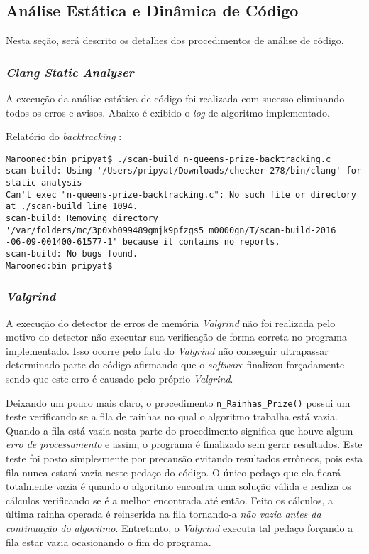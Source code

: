 \documentclass[12pt]{article}
\begin{document}
	\subsection{Análise Estática e Dinâmica de Código}
		Nesta seção, será descrito os detalhes dos procedimentos de análise de código.

	\subsubsection{\textit{Clang Static Analyser}}

		A execução da análise estática de código foi realizada com sucesso eliminando todos os erros e avisos. Abaixo é exibido o \textit{log} de algoritmo implementado.

		Relatório do \textit{backtracking} :
{\scriptsize
\begin{verbatim}
Marooned:bin pripyat$ ./scan-build n-queens-prize-backtracking.c
scan-build: Using '/Users/pripyat/Downloads/checker-278/bin/clang' for static analysis
Can't exec "n-queens-prize-backtracking.c": No such file or directory at ./scan-build line 1094.
scan-build: Removing directory '/var/folders/mc/3p0xb099489gmjk9pfzgs5_m0000gn/T/scan-build-2016
-06-09-001400-61577-1' because it contains no reports.
scan-build: No bugs found.
Marooned:bin pripyat$
\end{verbatim}
}

	\subsubsection{\textit{Valgrind}}
		A execução do detector de erros de memória \textit{Valgrind} não foi realizada pelo motivo do detector não executar sua verificação de forma correta no programa implementado. Isso ocorre pelo fato do \textit{Valgrind} não conseguir ultrapassar determinado parte do código afirmando que o \textit{software} finalizou forçadamente sendo que este erro é causado pelo próprio \textit{Valgrind}. 

		Deixando um pouco mais claro, o procedimento \verb|n_Rainhas_Prize()| possui um teste verificando se a fila de rainhas no qual o algoritmo trabalha está vazia. Quando a fila está vazia nesta parte do procedimento significa que houve algum \textit{erro de processamento} e assim, o programa é finalizado sem gerar resultados. Este teste foi posto simplesmente por precausão evitando resultados errôneos, pois esta fila nunca estará vazia neste pedaço do código.
		O único pedaço que ela ficará totalmente vazia é quando o algoritmo encontra uma solução válida e realiza os cálculos verificando se é a melhor encontrada até então. Feito os cálculos, a última rainha operada é reinserida na fila tornando-a \textit{não vazia antes da continuação do algoritmo}. Entretanto, o \textit{Valgrind} executa tal pedaço forçando a fila estar vazia ocasionando o fim do programa.
\end{document}
